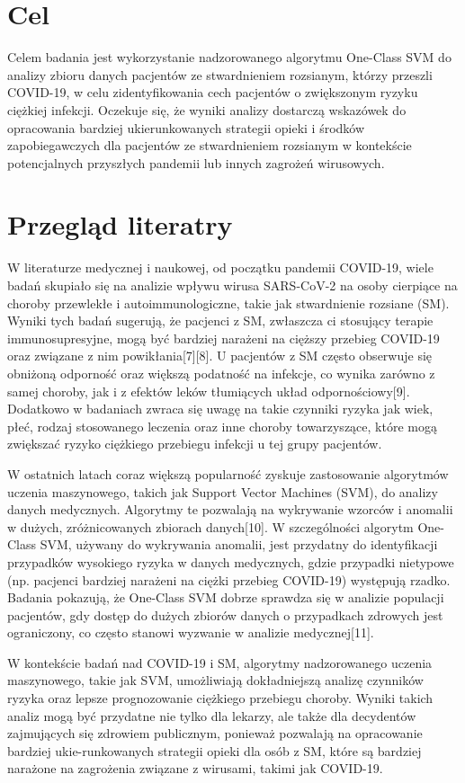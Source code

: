 \documentclass[a4paper,fleqn]{cas-dc}
\begin{document}
\section{Cel}
Celem badania jest wykorzystanie nadzorowanego algorytmu One-Class SVM do analizy zbioru danych pacjentów ze stwardnieniem rozsianym, którzy przeszli COVID-19, w celu zidentyfikowania cech pacjentów o zwiększonym ryzyku ciężkiej infekcji. Oczekuje się, że wyniki analizy dostarczą wskazówek do opracowania bardziej ukierunkowanych strategii opieki i środków zapobiegawczych dla pacjentów ze stwardnieniem rozsianym w kontekście potencjalnych przyszłych pandemii lub innych zagrożeń wirusowych.

\section{Przegląd literatry}
W literaturze medycznej i naukowej, od początku pandemii COVID-19, wiele badań skupiało się na analizie wpływu wirusa SARS-CoV-2 na osoby cierpiące na choroby przewlekłe i autoimmunologiczne, takie jak stwardnienie rozsiane (SM). Wyniki tych badań sugerują, że pacjenci z SM, zwłaszcza ci stosujący terapie immunosupresyjne, mogą być bardziej narażeni na cięższy przebieg COVID-19 oraz związane z nim powikłania[7][8]. U pacjentów z SM często obserwuje się obniżoną odporność oraz większą podatność na infekcje, co wynika zarówno z samej choroby, jak i z efektów leków tłumiących układ odpornościowy[9]. Dodatkowo w badaniach zwraca się uwagę na takie czynniki ryzyka jak wiek, płeć, rodzaj stosowanego leczenia oraz inne choroby towarzyszące, które mogą zwiększać ryzyko ciężkiego przebiegu infekcji u tej grupy pacjentów.

W ostatnich latach coraz większą popularność zyskuje zastosowanie algorytmów uczenia maszynowego, takich jak Support Vector Machines (SVM), do analizy danych medycznych. Algorytmy te pozwalają na wykrywanie wzorców i anomalii w dużych, zróżnicowanych zbiorach danych[10]. W szczególności algorytm One-Class SVM, używany do wykrywania anomalii, jest przydatny do identyfikacji przypadków wysokiego ryzyka w danych medycznych, gdzie przypadki nietypowe (np. pacjenci bardziej narażeni na ciężki przebieg COVID-19) występują rzadko. Badania pokazują, że One-Class SVM dobrze sprawdza się w analizie populacji pacjentów, gdy dostęp do dużych zbiorów danych o przypadkach zdrowych jest ograniczony, co często stanowi wyzwanie w analizie medycznej[11].

W kontekście badań nad COVID-19 i SM, algorytmy nadzorowanego uczenia maszynowego, takie jak SVM, umożliwiają dokładniejszą analizę czynników ryzyka oraz lepsze prognozowanie ciężkiego przebiegu choroby. Wyniki takich analiz mogą być przydatne nie tylko dla lekarzy, ale także dla decydentów zajmujących się zdrowiem publicznym, ponieważ pozwalają na opracowanie bardziej ukie-runkowanych strategii opieki dla osób z SM, które są bardziej narażone na zagrożenia związane z wirusami, takimi jak COVID-19.
\end{document}
